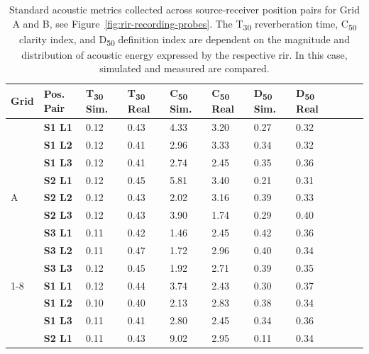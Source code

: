 \begin{table}[htb]
    \centering
    \caption[Ray tracing testing --- acoustic metrics extracted from simulated and real soundfields]{Standard acoustic metrics collected across source-receiver position pairs for Grid A and B, see Figure~\ref{fig:rir-recording-probes}. The T\textsubscript{30} reverberation time, C\textsubscript{50} clarity index, and D\textsubscript{50} definition index are dependent on the magnitude and distribution of acoustic energy expressed by the respective \acrshort{rir}. In this case, simulated and measured  are compared.}\label{tab:rt-metrics}
    \begin{tabular}{@{}lllllllllll@{}}
    \toprule
      Grid & 
      Pos. Pair &
      T\textsubscript{30} Sim. &
      T\textsubscript{30} Real &
      C\textsubscript{50} Sim. &
      C\textsubscript{50} Real &
      D\textsubscript{50} Sim. &
      D\textsubscript{50} Real \\ \midrule
    \multirow{9}{*}{A} & \textbf{S1 L1}      & 0.12 & 0.43 & 4.33 & 3.20 & 0.27 & 0.32 \\
                            & \textbf{S1 L2} & 0.12 & 0.41 & 2.96 & 3.33 & 0.34 & 0.32 \\
                            & \textbf{S1 L3} & 0.12 & 0.41 & 2.74 & 2.45 & 0.35 & 0.36 \\
                            & \textbf{S2 L1} & 0.12 & 0.45 & 5.81 & 3.40 & 0.21 & 0.31 \\
                            & \textbf{S2 L2} & 0.12 & 0.43 & 2.02 & 3.16 & 0.39 & 0.33 \\
                            & \textbf{S2 L3} & 0.12 & 0.43 & 3.90 & 1.74 & 0.29 & 0.40 \\
                            & \textbf{S3 L1} & 0.11 & 0.42 & 1.46 & 2.45 & 0.42 & 0.36 \\
                            & \textbf{S3 L2} & 0.11 & 0.47 & 1.72 & 2.96 & 0.40 & 0.34 \\
                            & \textbf{S3 L3} & 0.12 & 0.45 & 1.92 & 2.71 & 0.39 & 0.35 \\ \cmidrule(l){1-8}
    \multirow{9}{*}{B} & \textbf{S1 L1}      & 0.12 & 0.44 & 3.74 & 2.43 & 0.30 & 0.37 \\
                            & \textbf{S1 L2} & 0.10 & 0.40 & 2.13 & 2.83 & 0.38 & 0.34 \\
                            & \textbf{S1 L3} & 0.11 & 0.41 & 2.80 & 2.45 & 0.34 & 0.36 \\
                            & \textbf{S2 L1} & 0.11 & 0.43 & 9.02 & 2.95 & 0.11 & 0.34 \\

\end{tabular}
\end{table}
